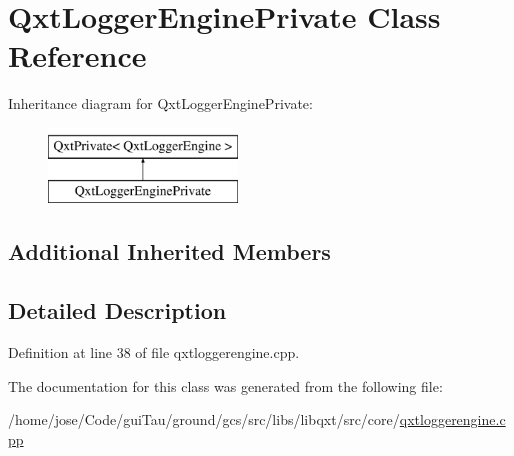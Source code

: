 \hypertarget{class_qxt_logger_engine_private}{\section{Qxt\-Logger\-Engine\-Private Class Reference}
\label{class_qxt_logger_engine_private}
}
Inheritance diagram for Qxt\-Logger\-Engine\-Private\-:\begin{figure}[H]
\begin{center}
\leavevmode
\includegraphics[height=2.000000cm]{class_qxt_logger_engine_private}
\end{center}
\end{figure}
\subsection*{Additional Inherited Members}


\subsection{Detailed Description}


Definition at line 38 of file qxtloggerengine.\-cpp.



The documentation for this class was generated from the following file\-:\begin{DoxyCompactItemize}
\item 
/home/jose/\-Code/gui\-Tau/ground/gcs/src/libs/libqxt/src/core/\hyperlink{qxtloggerengine_8cpp}{qxtloggerengine.\-cpp}\end{DoxyCompactItemize}
